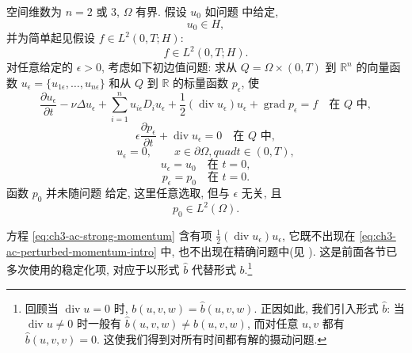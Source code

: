 空间维数为 $n=2$ 或 $3$, $\Omega$ 有界. 假设 $u_0$ 如问题  中给定,
\begin{equation}
u_0\in H,
\label{eq:ch3-ac-initial-data}
\end{equation}
并为简单起见假设 $f\in L^2(0,T;H)$:
\begin{equation}
f\in L^2(0,T;H).
\label{eq:ch3-ac-force-data}
\end{equation}
对任意给定的 $\epsilon>0$, 考虑如下初边值问题: 求从 $Q=\Omega\times(0,T)$ 到 $\mathbb R^n$ 的向量函数 $u_\epsilon=\{u_{1\epsilon},\ldots,u_{n\epsilon}\}$ 和从 $Q$ 到 $\mathbb R$ 的标量函数 $p_\epsilon$, 使
\begin{equation}
\frac{\partial u_\epsilon}{\partial t}
-\nu\Delta u_\epsilon
+\sum_{i=1}^n u_{i\epsilon}D_i u_\epsilon
+\frac12(\operatorname{div}u_\epsilon)u_\epsilon
+\operatorname{grad}p_\epsilon=f
\quad\text{在 }Q\text{ 中},
\label{eq:ch3-ac-strong-momentum}
\end{equation}
\begin{equation}
\epsilon\frac{\partial p_\epsilon}{\partial t}
+\operatorname{div}u_\epsilon=0
\quad\text{在 }Q\text{ 中},
\label{eq:ch3-ac-strong-continuity}
\end{equation}
\begin{equation}
u_\epsilon=0,
\qquad x\in\partial\Omega,quad t\in(0,T),
\label{eq:ch3-ac-boundary-condition}
\end{equation}
\begin{equation}
u_\epsilon=u_0\quad\text{在 }t=0,
\label{eq:ch3-ac-velocity-initial}
\end{equation}
\begin{equation}
p_\epsilon=p_0\quad\text{在 }t=0.
\label{eq:ch3-ac-pressure-initial}
\end{equation}
函数 $p_0$ 并未随问题  给定, 这里任意选取, 但与 $\epsilon$ 无关, 且
\begin{equation}
p_0\in L^2(\Omega).
\label{eq:ch3-ac-pressure-data}
\end{equation}

方程 \eqref{eq:ch3-ac-strong-momentum} 含有项 $\frac12(\operatorname{div}u_\epsilon)u_\epsilon$, 它既不出现在 \eqref{eq:ch3-ac-perturbed-momentum-intro} 中, 也不出现在精确问题中(见 ). 这是前面各节已多次使用的稳定化项, 对应于以形式 $\widehat b$ 代替形式 $b$.\footnote{回顾当 $\operatorname{div}u=0$ 时, $b(u,v,w)=\widehat b(u,v,w)$. 正因如此, 我们引入形式 $\widehat b$: 当 $\operatorname{div}u\neq0$ 时一般有 $\widehat b(u,v,w)\neq b(u,v,w)$, 而对任意 $u,v$ 都有 $\widehat b(u,v,v)=0$. 这使我们得到对所有时间都有解的摄动问题.}

